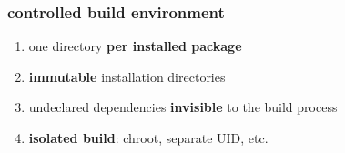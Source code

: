 \documentclass{beamer}
\begin{document}





\begin{frame}
  \frametitle{controlled build environment}

  \begin{enumerate}
    \item one directory \alert{\textbf{per installed package}}
    \item \alert{\textbf{immutable}} installation directories
    \item undeclared dependencies \alert{\textbf{invisible}} to the build process
    \item \alert{\textbf{isolated build}}: chroot, separate UID, etc.
  \end{enumerate}

\end{frame}
\end{document}
